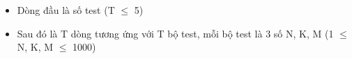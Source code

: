 \begin{itemize}
	\item     Dòng đầu là số test (T  $\le$  5)   
	\item     Sau đó là T dòng tương ứng với T bộ test, mỗi bộ test là 3 số N, K, M (1  $\le$  N, K, M  $\le$  1000)   
\end{itemize}